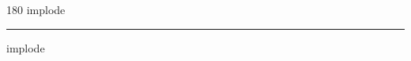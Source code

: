 
\begin{frame}
\begin{center}
\begin{turn}{180}
{\fontsize{2.5cm}{1em}\selectfont implode}
\end{turn}
\vspace{1em}\par  
\hrule
\vspace{1em}\par  
{\fontsize{2.5cm}{1em}\selectfont implode}
\end{center}
\end{frame}
